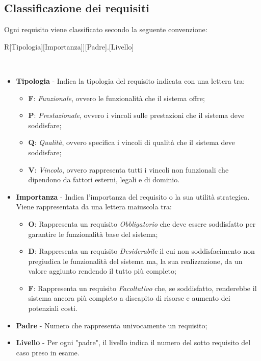 \subsection{Classificazione dei requisiti}
Ogni requisito viene classificato secondo la seguente convenzione:\\
\centerline{R[Tipologia][Importanza]][Padre].[Livello]}\\
\begin{itemize}
	\item \textbf{Tipologia} - Indica la tipologia del requisito indicata con una lettera tra:
	\begin{itemize}
		\item \textbf{F}: \textit{Funzionale}, ovvero le funzionalità che il sistema offre;
		\item \textbf{P}: \textit{Prestazionale}, ovvero i vincoli sulle prestazioni che il sistema deve soddisfare;
		\item \textbf{Q}: \textit{Qualità}, ovvero specifica i vincoli di qualità che il sistema deve soddisfare;
		\item \textbf{V}: \textit{Vincolo}, ovvero rappresenta tutti i vincoli non funzionali che dipendono da fattori esterni, legali e di dominio.
	\end{itemize}
	\item \textbf{Importanza} - Indica l'importanza del requisito o la sua utilità strategica. Viene rappresentata da una lettera maiuscola tra:
	\begin{itemize}
		\item \textbf{O}: Rappresenta un requisito \textit{Obbligatorio} che deve essere soddisfatto per garantire le funzionalità base del sistema;
		\item \textbf{D}: Rappresenta un requisito \textit{Desiderabile} il cui non soddisfacimento non pregiudica le funzionalità del sistema ma, la sua realizzazione, da un valore aggiunto rendendo il tutto più completo;
		\item \textbf{F}: Rappresenta un requisito \textit{Facoltativo} che, se soddisfatto, renderebbe il sistema ancora più completo a discapito di risorse e aumento dei potenziali costi.
	\end{itemize}
	\item \textbf{Padre} - Numero che rappresenta univocamente un requisito;
	\item \textbf{Livello} - Per ogni "padre", il livello indica il numero del sotto requisito del caso preso in esame.
\end{itemize}
